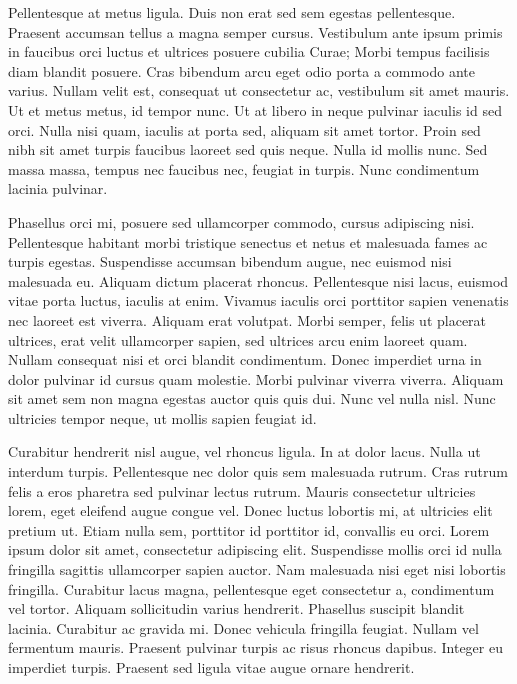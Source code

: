 Pellentesque at metus ligula.
Duis non erat sed sem egestas pellentesque.
Praesent accumsan tellus a magna semper cursus.
Vestibulum ante ipsum primis in faucibus orci luctus et ultrices posuere cubilia Curae; Morbi tempus facilisis diam blandit posuere.
Cras bibendum arcu eget odio porta a commodo ante varius.
Nullam velit est, consequat ut consectetur ac, vestibulum sit amet mauris.
Ut et metus metus, id tempor nunc.
Ut at libero in neque pulvinar iaculis id sed orci.
Nulla nisi quam, iaculis at porta sed, aliquam sit amet tortor.
Proin sed nibh sit amet turpis faucibus laoreet sed quis neque.
Nulla id mollis nunc.
Sed massa massa, tempus nec faucibus nec, feugiat in turpis.
Nunc condimentum lacinia pulvinar.

Phasellus orci mi, posuere sed ullamcorper commodo, cursus adipiscing nisi.
Pellentesque habitant morbi tristique senectus et netus et malesuada fames ac turpis egestas.
Suspendisse accumsan bibendum augue, nec euismod nisi malesuada eu.
Aliquam dictum placerat rhoncus.
Pellentesque nisi lacus, euismod vitae porta luctus, iaculis at enim.
Vivamus iaculis orci porttitor sapien venenatis nec laoreet est viverra.
Aliquam erat volutpat.
Morbi semper, felis ut placerat ultrices, erat velit ullamcorper sapien, sed ultrices arcu enim laoreet quam.
Nullam consequat nisi et orci blandit condimentum.
Donec imperdiet urna in dolor pulvinar id cursus quam molestie.
Morbi pulvinar viverra viverra.
Aliquam sit amet sem non magna egestas auctor quis quis dui.
Nunc vel nulla nisl.
Nunc ultricies tempor neque, ut mollis sapien feugiat id.

Curabitur hendrerit nisl augue, vel rhoncus ligula.
In at dolor lacus.
Nulla ut interdum turpis.
Pellentesque nec dolor quis sem malesuada rutrum.
Cras rutrum felis a eros pharetra sed pulvinar lectus rutrum.
Mauris consectetur ultricies lorem, eget eleifend augue congue vel.
Donec luctus lobortis mi, at ultricies elit pretium ut.
Etiam nulla sem, porttitor id porttitor id, convallis eu orci.
Lorem ipsum dolor sit amet, consectetur adipiscing elit.
Suspendisse mollis orci id nulla fringilla sagittis ullamcorper sapien auctor.
Nam malesuada nisi eget nisi lobortis fringilla.
Curabitur lacus magna, pellentesque eget consectetur a, condimentum vel tortor.
Aliquam sollicitudin varius hendrerit.
Phasellus suscipit blandit lacinia.
Curabitur ac gravida mi.
Donec vehicula fringilla feugiat.
Nullam vel fermentum mauris.
Praesent pulvinar turpis ac risus rhoncus dapibus.
Integer eu imperdiet turpis.
Praesent sed ligula vitae augue ornare hendrerit.

